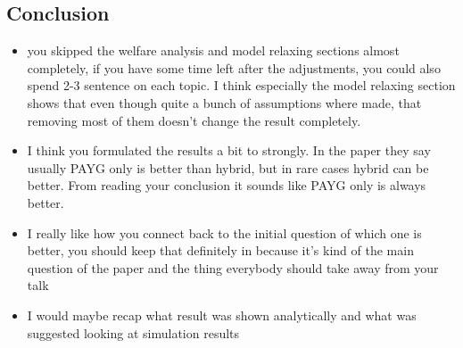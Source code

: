 \documentclass[]{article}
\begin{document}
\subsection{Conclusion}
\begin{itemize}
	\item you skipped the welfare analysis and model relaxing sections almost completely, if you have some time left after the adjustments, you could also spend 2-3 sentence on each topic. I think especially the model relaxing section shows that even though quite a bunch of assumptions where made, that removing most of them doesn't change the result completely.
	\item I think you formulated the results a bit to strongly. In the paper they say usually PAYG only is better than hybrid, but in rare cases hybrid can be better. From reading your conclusion it sounds like PAYG only is always better.
	\item I really like how you connect back to the initial question of which one is better, you should keep that definitely in because it's kind of the main question of the paper and the thing everybody should take away from your talk
	\item I would maybe recap what result was shown analytically and what was suggested looking at simulation results
\end{itemize}
\end{document}
